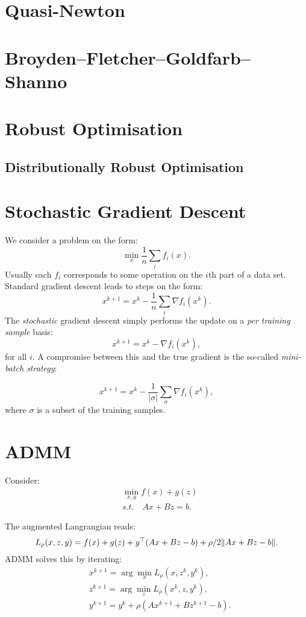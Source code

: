 \section{Quasi-Newton}

\section{Broyden–Fletcher–Goldfarb–Shanno}

\section{Robust Optimisation}

\subsection{Distributionally Robust Optimisation}

\section{Stochastic Gradient Descent}

We consider a problem on the form:
\[  
\min_x \frac1n \sum_i f_i(x).
\]
Usually each $f_i$ corresponds to some operation on the $i$th part of
a data set. Standard gradient descent leads to steps on the form:
\[
x^{k+1} = x^k - \frac1n \sum_i \nabla f_i (x^k).
\]
The \emph{stochastic} gradient descent simply performs the update on a
\emph{per training sample} basis:
\[
x^{k+1} = x^k - \nabla f_i (x^k),
\]
for all $i$. A compromise between this and the true gradient is the
so-called \emph{mini-batch strategy}:

\[
x^{k+1} = x^k - \frac{1}{|\sigma|}\sum_{\sigma}\nabla f_i (x^k),
\]
where $\sigma$ is a subset of the training samples.

\section{ADMM}

Consider:
\begin{align}
& \min_{x,y} f(x) + g(z)\\
& s.t.\quad Ax + Bz = b.
\end{align}

The augmented Langrangian reads:
\[
L_\rho(x,z,y) =  f(x) + g(z) + y^\top (Ax + Bz - b) + \rho/2\|Ax + Bz - b\|.
\]
ADMM solves this by iterating:
\begin{align}
& x^{k+1} = \arg\min_x L_\rho (x, z^k, y^k),\\
& z^{k+1} = \arg\min_z L_\rho (x^k, z, y^k),\\
& y^{k+1} = y^k + \rho(Ax^{k+1} + Bz^{k+1} - b).
\end{align}

